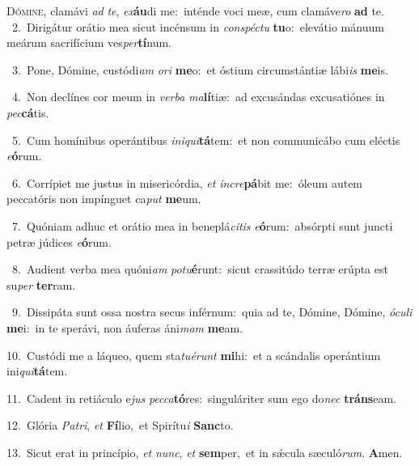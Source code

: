 \lettrine{\initial\textcolor{\initialcolor}{D}}{ómine,} clamávi \textit{ad} \textit{te}\-, \textit{ex}\-\textbf{áu}di me:~\star inténde voci meæ, cum clamáve\textit{ro} \textbf{ad} te.\\
{\numbfont\textcolor{\numbcolor}{~2.}}~Dirigátur orátio mea sicut incénsum in \textit{con}\-\textit{spéc}\textit{tu} \textbf{tu}\-o:~\star elevátio mánuum meárum sacrifícium ves\-\textit{per}\-\textbf{tí}num.\par
{\numbfont\textcolor{\numbcolor}{~3.}}~Pone, Dómine, custódi\textit{am} \textit{o}\-\textit{ri} \textbf{me}\-o:~\star et óstium circumstántiæ lábi\textit{is} \textbf{me}\-is.\par
{\numbfont\textcolor{\numbcolor}{~4.}}~Non declínes cor meum in \textit{ver}\-\textit{ba} \textit{ma}\-\textbf{lí}tiæ:~\star ad excusándas excusatiónes in \textit{pec}\-\textbf{cá}tis.\par
{\numbfont\textcolor{\numbcolor}{~5.}}~Cum homínibus operántibus \textit{in}\-\textit{i}\textit{qui}\textbf{tá}tem:~\star et non communicábo cum eléctis \textit{e}\-\textbf{ó}rum.\par
{\numbfont\textcolor{\numbcolor}{~6.}}~Corrípiet me justus in misericórdia, \textit{et} \textit{in}\-\textit{cre}\textbf{pá}bit me:~\star óleum autem peccatóris non impínguet ca\textit{put} \textbf{me}\-um.\par
{\numbfont\textcolor{\numbcolor}{~7.}}~Quóniam adhuc et orátio mea in beneplá\-\textit{ci}\-\textit{tis} \textit{e}\-\textbf{ó}rum:~\star absórpti sunt juncti petræ júdices \textit{e}\-\textbf{ó}rum.\par
{\numbfont\textcolor{\numbcolor}{~8.}}~Audient verba mea quóni\textit{am} \textit{pot}\-\textit{u}\textbf{é}runt:~\star sicut crassitúdo terræ erúpta est su\textit{per} \textbf{ter}\-ram.\par
{\numbfont\textcolor{\numbcolor}{~9.}}~Dissipáta sunt ossa nostra secus inférnum:~\dagger quia ad te, Dómine, Dómine, \textit{ó}\-\textit{cu}\textit{li} \textbf{me}\-i:~\star in te sperávi, non áuferas áni\textit{mam} \textbf{me}\-am.\par
{\numbfont\textcolor{\numbcolor}{10.}}~Custódi me a láqueo, quem sta\-\textit{tu}\-\textit{é}\textit{runt} \textbf{mi}\-hi:~\star et a scándalis operántium ini\-\textit{qui}\-\textbf{tá}tem.\par
{\numbfont\textcolor{\numbcolor}{11.}}~Cadent in retiáculo e\textit{jus} \textit{pec}\-\textit{ca}\textbf{tó}res:~\star singuláriter sum ego do\textit{nec} \textbf{tráns}\-eam.\par
{\numbfont\textcolor{\numbcolor}{12.}}~Glória \textit{Pa}\-\textit{tri}, \textit{et} \textbf{Fí}\-lio,~\star et Spirítu\textit{i} \textbf{Sanc}\-to.\par
{\numbfont\textcolor{\numbcolor}{13.}}~Sicut erat in princípio, \textit{et} \textit{nunc}\-, \textit{et} \textbf{sem}\-per,~\star et in sǽcula sæculó\-\textit{rum}\-. \textbf{A}\-men.\par
